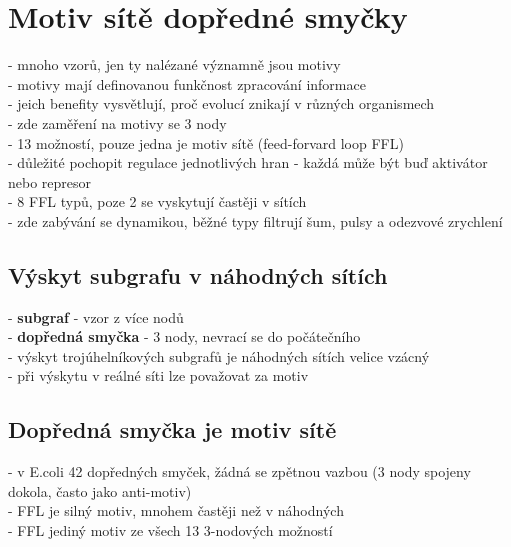\documentclass[11pt,a4paper]{report}
\begin{document}
\chapter{Motiv sítě dopředné smyčky}
- mnoho vzorů, jen ty nalézané významně jsou motivy\\
- motivy mají definovanou funkčnost zpracování informace\\
\indent - jeich benefity vysvětlují, proč evolucí znikají v různých organismech\\
- zde zaměření na motivy se 3 nody\\
\indent - 13 možností, pouze jedna je motiv sítě (feed-forvard loop FFL)\\
\indent - důležité pochopit regulace jednotlivých hran - každá může být buď aktivátor nebo represor\\
\indent - 8 FFL typů, poze 2 se vyskytují častěji v sítích\\
\indent - zde zabývání se dynamikou, běžné typy filtrují šum, pulsy a odezvové zrychlení\\

\section{Výskyt subgrafu v náhodných sítích}
- \textbf{subgraf} - vzor z více nodů\\
- \textbf{dopředná smyčka} - 3 nody, nevrací se do počátečního\\
- výskyt trojúhelníkových subgrafů je náhodných sítích velice vzácný\\
- při výskytu v reálné síti lze považovat za motiv\\

\section{Dopředná smyčka je motiv sítě}
- v E.coli 42 dopředných smyček, žádná se zpětnou vazbou (3 nody spojeny dokola, často jako anti-motiv)\\
\indent - FFL je silný motiv, mnohem častěji než v náhodných\\
\indent - FFL jediný motiv ze všech 13 3-nodových možností\\
\end{document}
